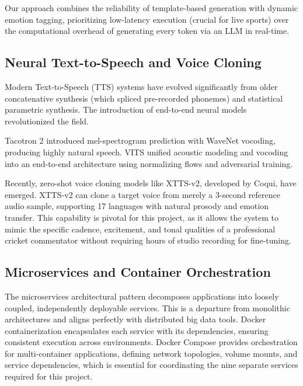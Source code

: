 Our approach combines the reliability of template-based generation with dynamic emotion tagging, prioritizing low-latency execution (crucial for live sports) over the computational overhead of generating every token via an LLM in real-time.

\subsection{Neural Text-to-Speech and Voice Cloning}
Modern Text-to-Speech (TTS) systems have evolved significantly from older concatenative synthesis (which spliced pre-recorded phonemes) and statistical parametric synthesis. The introduction of end-to-end neural models revolutionized the field. 

Tacotron 2 introduced mel-spectrogram prediction with WaveNet vocoding, producing highly natural speech. VITS unified acoustic modeling and vocoding into an end-to-end architecture using normalizing flows and adversarial training. 

Recently, zero-shot voice cloning models like XTTS-v2, developed by Coqui, have emerged. XTTS-v2 can clone a target voice from merely a 3-second reference audio sample, supporting 17 languages with natural prosody and emotion transfer. This capability is pivotal for this project, as it allows the system to mimic the specific cadence, excitement, and tonal qualities of a professional cricket commentator without requiring hours of studio recording for fine-tuning.

\subsection{Microservices and Container Orchestration}
The microservices architectural pattern decomposes applications into loosely coupled, independently deployable services. This is a departure from monolithic architectures and aligns perfectly with distributed big data tools. Docker containerization encapsulates each service with its dependencies, ensuring consistent execution across environments. Docker Compose provides orchestration for multi-container applications, defining network topologies, volume mounts, and service dependencies, which is essential for coordinating the nine separate services required for this project.
